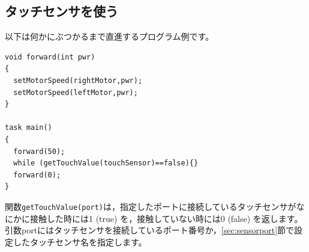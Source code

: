 \documentclass[11pt]{jsarticle}
\makeatletter
\def\nmindex{\@ifnextchar[{\@nmindex}{\@@nmindex}}
\def\@nmindex[#1]#2{#2\index{#1@#2}}
\def\@@nmindex#1{#1\index{#1}}
\makeatother
\begin{document}
\subsection{タッチセンサを使う}

以下は何かにぶつかるまで直進するプログラム例です。

\begin{lstlisting}
void forward(int pwr)
{
  setMotorSpeed(rightMotor,pwr);
  setMotorSpeed(leftMotor,pwr);
}

task main()
{
  forward(50);
  while (getTouchValue(touchSensor)==false){}
  forward(0);
}
\end{lstlisting}

関数\verb|getTouchValue(port)|は，指定したポートに接続しているタッチセンサがなにかに接触した時には1 (true) を，接触していない時には0 (false) を返します。
引数portにはタッチセンサを接続しているポート番号か，\ref{sec:sensorport}節で設定したタッチセンサ名を指定します。




\end{document}
